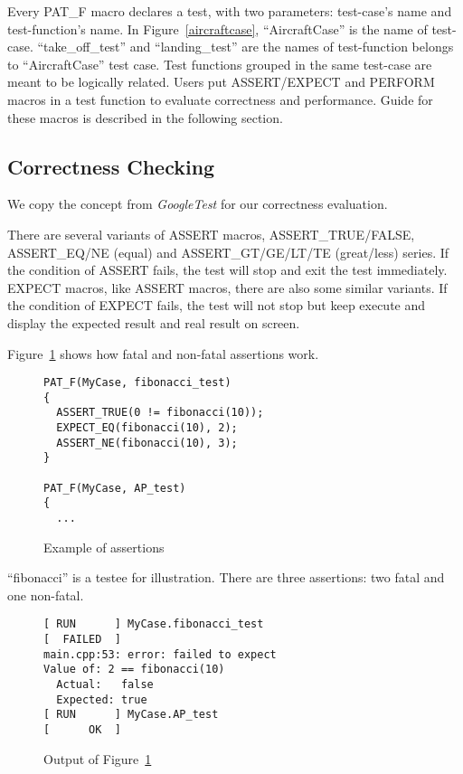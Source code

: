 \documentclass[final]{ols}
\begin{document}
Every PAT\_F macro declares a test, with two parameters: test-case's name and test-function's name.
In Figure~\ref{aircraftcase}, ``AircraftCase'' is the name of test-case.
``take\_off\_test'' and ``landing\_test'' are the names of test-function belongs to ``AircraftCase'' test case.
Test functions grouped in the same test-case are meant to be logically related.
Users put ASSERT/EXPECT and PERFORM macros in a test function to evaluate correctness and performance.
Guide for these macros is described in the following section.

\subsection{Correctness Checking}
We copy the concept from \textit{GoogleTest} for our correctness evaluation.

There are several variants of ASSERT macros, ASSERT\_TRUE/FALSE, ASSERT\_EQ/NE (equal) and ASSERT\_GT/GE/LT/TE (great/less) series.
If the condition of ASSERT fails, the test will stop and exit the test immediately.
EXPECT macros, like ASSERT macros, there are also some similar variants.
If the condition of EXPECT fails, the test will not stop but keep execute and display the expected result and real result on screen.

Figure~\ref{assert_example} shows how fatal and non-fatal assertions work.

\begin{figure}[h]
\lstset{language=C++}
\begin{lstlisting}[frame=single]
PAT_F(MyCase, fibonacci_test)
{
  ASSERT_TRUE(0 != fibonacci(10));
  EXPECT_EQ(fibonacci(10), 2);
  ASSERT_NE(fibonacci(10), 3);
}

PAT_F(MyCase, AP_test)
{
  ...
\end{lstlisting}
\caption{Example of assertions}
\label{assert_example}
\end{figure}

``fibonacci'' is a testee for illustration.
There are three assertions: two fatal and one non-fatal.

\begin{figure}[h]
\lstset{language=sh}
\begin{lstlisting}[frame=single]
[ RUN      ] MyCase.fibonacci_test
[  FAILED  ]
main.cpp:53: error: failed to expect
Value of: 2 == fibonacci(10)
  Actual:   false
  Expected: true
[ RUN      ] MyCase.AP_test
[      OK  ]
\end{lstlisting}
\caption{Output of Figure~\ref{assert_example}}
\label{assert_example_output}
\end{figure}
\end{document}
